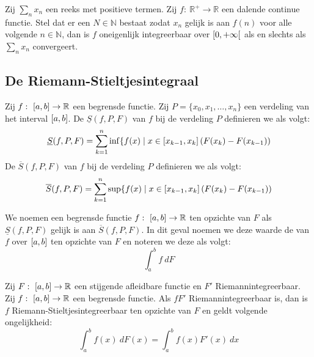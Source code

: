 \documentclass[main.tex]{subfiles}
\begin{document}
\begin{bst}
  Zij $\sum_{n}x_{n}$ een reeks met positieve termen.
  Zij $f:\ \mathbb{R}^{+}\rightarrow \mathbb{R}$ een dalende continue functie.
  Stel dat er een $N\in \mathbb{N}$ bestaat zodat $x_{n}$ gelijk is aan $f(n)$ voor alle volgende $n\in \mathbb{N}$, dan is $f$ oneigenlijk integreerbaar over $\interval[open right]{0}{+\infty}$ als en slechts als $\sum_{n}x_{n}$ convergeert.
\end{bst}

\subsection{De Riemann-Stieltjesintegraal}
\label{sec:de-riem-stieltj}

\begin{de}
  Zij $f:\ \interval{a}{b} \rightarrow \mathbb{R}$ een begrensde functie.
  Zij $P = \{x_{0},x_{1},\dotsc,x_{n}\}$ een verdeling van het interval $\interval{a}{b}$.
  De  $\underline{S}(f,P,F)$ van $f$ bij de verdeling $P$ definieren we als volgt:
\[ \underline{S}(f,P,F) = \sum_{k=1}^{n} \inf\{ f(x) \mid x\in \interval{x_{k-1}}{x_{k}} \left( F(x_{k}) - F(x_{k-1}) \right) \]
  De  $\overline{S}(f,P,F)$ van $f$ bij de verdeling $P$ definieren we als volgt:
\[ \overline{S}(f,P,F) = \sum_{k=1}^{n} \sup\{ f(x) \mid x\in \interval{x_{k-1}}{x_{k}} \left( F(x_{k}) - F(x_{k-1}) \right) \]
\end{de}

\begin{de}
  We noemen een begrensde functie $f:\ \interval{a}{b} \rightarrow \mathbb{R}$  ten opzichte van $F$ als $\underline{S}(f,P,F)$ gelijk is aan $\overline{S}(f,P,F)$.
  In dit geval noemen we deze waarde de  van $f$ over $\interval{a}{b}$ ten opzichte van $F$ en noteren we deze als volgt:
  \[ \int_{a}^{b}f\ dF \]
\end{de}

\begin{bst}
  Zij $F:\ \interval{a}{b}\rightarrow \mathbb{R}$ een stijgende afleidbare functie en $F'$ Riemannintegreerbaar.
  Zij $f:\ \interval{a}{b} \rightarrow \mathbb{R}$ een begrensde functie.
  Als $fF'$ Riemannintegreerbaar is, dan is $f$ Riemann-Stieltjesintegreerbaar ten opzichte van $F$ en geldt volgende ongelijkheid:
  \[ \int_{a}^{b}f(x)\ dF(x) = \int_{a}^{b}f(x)F'(x)\ dx \]
\end{bst}
\end{document}
